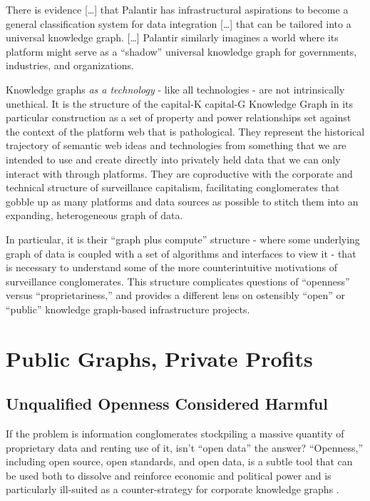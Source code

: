 \documentclass{article}
\renewenvironment{leftbar}
{\vspace{6pt}\def\FrameCommand{\hspace{0em}\vrule width 0.5pt \hspace{1em}}\MakeFramed {\advance\hsize-\width \FrameRestore}}
{\endMakeFramed}
\begin{document}
\begin{leftbar}
There is evidence {[}\ldots{]} that Palantir has infrastructural
aspirations to become a general classification system for data
integration {[}\ldots{]} that can be tailored into a universal knowledge
graph. {[}\ldots{]} Palantir similarly imagines a world where its
platform might serve as a ``shadow'' universal knowledge graph for
governments, industries, and organizations. \cite{iliadisSeerSeenSurveying2022} 
\end{leftbar}

Knowledge graphs \emph{as a technology} - like all technologies - are
not intrinsically unethical. It is the structure of the capital-K
capital-G Knowledge Graph in its particular construction as a set of
property and power relationships set against the context of the platform
web that is pathological. They represent the historical trajectory of
semantic web ideas and technologies from something that we are intended
to use and create directly into privately held data that we can only
interact with through platforms. They are coproductive with the
corporate and technical structure of surveillance capitalism,
facilitating conglomerates that gobble up as many platforms and data
sources as possible to stitch them into an expanding, heterogeneous
graph of data.

In particular, it is their ``graph plus compute'' structure - where some
underlying graph of data is coupled with a set of algorithms and
interfaces to view it - that is necessary to understand some of the more
counterintuitive motivations of surveillance conglomerates. This
structure complicates questions of ``openness'' versus
``proprietariness,'' and provides a different lens on ostensibly
``open'' or ``public'' knowledge graph-based infrastructure projects.

\hypertarget{public-graphs-private-profits}{%
\section{Public Graphs, Private
Profits}\label{public-graphs-private-profits}}

\hypertarget{unqualified-openness-considered-harmful}{%
\subsection{Unqualified Openness Considered
Harmful}\label{unqualified-openness-considered-harmful}}

If the problem is information conglomerates stockpiling a massive
quantity of proprietary data and renting use of it, isn't ``open data''
the answer? ``Openness,'' including open source, open standards, and
open data, is a subtle tool that can be used both to dissolve and
reinforce economic and political power and is particularly ill-suited as
a counter-strategy for corporate knowledge graphs .
\end{document}
